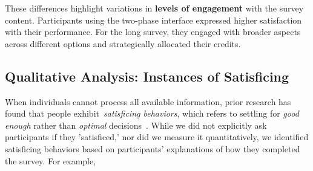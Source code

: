 These differences highlight variations in \textbf{levels of engagement} with the survey content. Participants using the two-phase interface expressed higher satisfaction with their performance. For the long survey, they engaged with broader aspects across different options and strategically allocated their credits.

\subsection{Qualitative Analysis: Instances of Satisficing}
\label{sec:satisficing}
When individuals cannot process all available information, prior research has found that people exhibit~\textit{satisficing behaviors}, which refers to settling for \textit{good enough} rather than \textit{optimal} decisions~\cite{gigerenzerReasoningFastFrugal1996}. While we did not explicitly ask participants if they 'satisficed,' nor did we measure it quantitatively, we identified satisficing behaviors based on participants' explanations of how they completed the survey. For example, 




